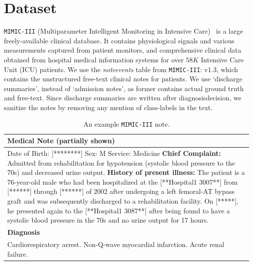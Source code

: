 \section{Dataset}
    \texttt{\texttt{MIMIC-III}} (Multiparameter Intelligent Monitoring in Intensive Care)~\cite{johnson2016mimic} is a large freely-available clinical database. It contains physiological signals and various measurements captured from patient monitors, and comprehensive clinical data obtained from hospital medical information systems for over $58K$ Intensive Care Unit (ICU) patients.  We use the \emph{noteevents} table from \texttt{\texttt{MIMIC-III}}: v1.3, which contains the unstructured free-text clinical notes for patients. We use `discharge summaries', instead of `admission notes', as former contains actual ground truth and free-text. Since discharge summaries are written after diagnosisdecision, we sanitize the notes by removing any mention of class-labels in the text.


\begin{table}
    \small
    \centering
\label{mimic-ii}
    \def\arraystretch{1.5}
    \begin{tabularx}{8.5cm}{X}
    \midrule
    \textbf{Medical Note} (partially shown) \\
    \midrule
    Date of Birth:   {\tiny [********] }     Sex:  M \newline
    Service:  Medicine \newline
    \textbf{Chief Complaint:} \newline
    Admitted from rehabilitation for
    hypotension (systolic blood pressure to the 70s) and
    decreased urine output.
    \textbf{History of present illness:} \newline
    The patient is a 76-year-old male who had
    been hospitalized at the {\tiny[**Hospital1 3007**]} from {\tiny[******]} through {\tiny[******]} of 2002
    after undergoing a left femoral-AT bypass graft and was
    subsequently discharged to a rehabilitation facility. \newline
    On {\tiny[*****]}, he presented again to the {\tiny[**Hospital1 3087**]}
    after being found to have a systolic
    blood pressure in the 70s and no urine output for 17 hours.\\
    
    \midrule
    \textbf{Diagnosis} \\
    \midrule
    Cardiorespiratory arrest. \newline
    Non-Q-wave myocardial infarction. \newline
    Acute renal failure. \\
    \midrule
    \end{tabularx}
    \caption[Sample MIMIC note]{An example \texttt{\texttt{MIMIC-III}} note.}
\end{table}


